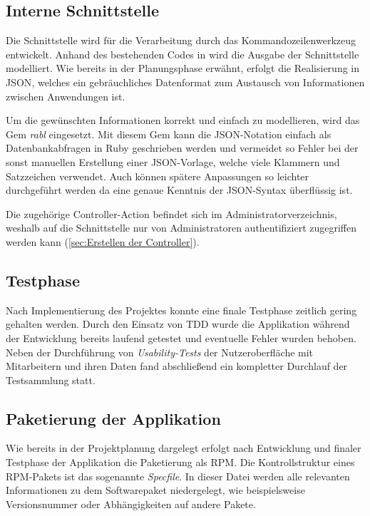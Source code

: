 \subsection{Interne Schnittstelle}
\label{sec:Interne Schnittstelle}
Die Schnittstelle wird für die Verarbeitung durch das Kommandozeilenwerkzeug  entwickelt.
Anhand des bestehenden Codes in  wird die Ausgabe der Schnittstelle modelliert.
Wie bereits in der Planungsphase erwähnt, erfolgt die Realisierung in \acs{JSON},
welches ein gebräuchliches Datenformat zum Austausch von Informationen zwischen Anwendungen ist.

Um die gewünschten Informationen korrekt und einfach zu modellieren, wird das Gem \textit{rabl}
eingesetzt. Mit diesem Gem kann die JSON-Notation einfach als Datenbankabfragen in Ruby
geschrieben werden und vermeidet so Fehler bei der sonst manuellen Erstellung einer JSON-Vorlage,
welche viele Klammern und Satzzeichen verwendet. Auch können spätere Anpassungen so leichter
durchgeführt werden da eine genaue Kenntnis der JSON-Syntax überflüssig ist.

Die zugehörige Controller-Action befindet sich im Administratorverzeichnis, weshalb auf die Schnittstelle
nur von Administratoren authentifiziert zugegriffen werden kann (\Vgl \ref{sec:Erstellen der Controller}).

\subsection{Testphase}
\label{sec:Testphase}
Nach Implementierung des Projektes konnte eine finale Testphase zeitlich gering gehalten werden.
Durch den Einsatz von \acs{TDD} wurde die Applikation während der Entwicklung bereits laufend
getestet und eventuelle Fehler wurden behoben. Neben der Durchführung von \textit{Usability-Tests}
der Nutzeroberfläche mit Mitarbeitern und ihren Daten fand abschließend ein kompletter
Durchlauf der Testsammlung statt.

\subsection{Paketierung der Applikation}
\label{sec:Paketierung der Applikation}
Wie bereits in der Projektplanung dargelegt erfolgt nach Entwicklung und finaler Testphase der
Applikation die Paketierung als RPM. Die Kontrollstruktur eines RPM-Pakets ist das sogenannte
\emph{Specfile}. In dieser Datei werden alle relevanten Informationen zu dem
Softwarepaket niedergelegt, wie beispielsweise Versionsnummer oder Abhängigkeiten auf andere Pakete.


